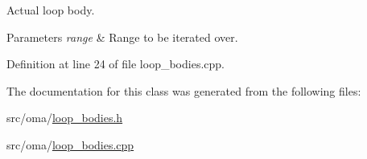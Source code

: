 Actual loop body. 


\begin{DoxyParams}{Parameters}
{\em range} & Range to be iterated over. \\
\hline
\end{DoxyParams}


Definition at line 24 of file loop\-\_\-bodies.\-cpp.



The documentation for this class was generated from the following files\-:\begin{DoxyCompactItemize}
\item 
src/oma/\hyperlink{loop__bodies_8h}{loop\-\_\-bodies.\-h}\item 
src/oma/\hyperlink{loop__bodies_8cpp}{loop\-\_\-bodies.\-cpp}\end{DoxyCompactItemize}
